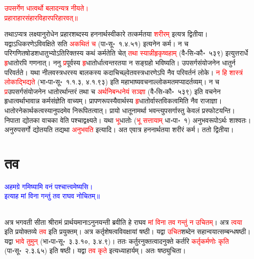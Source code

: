 \centering\textcolor{red}{उपसर्गेण धात्वर्थो बलादन्यत्र नीयते।\nopagebreak\\
प्रहाराहारसंहारविहारपरिहारवत्॥}\\
\begin{sloppypar}\justifying\noindent\hspace{10mm} तथाऽप्यत्र 
लक्ष्यानुरोधेन प्रहार\-शब्दस्य हननार्थ\-स्वीकारे तत्कर्मतया \textcolor{red}{शरीरम्‌} इत्यत्र द्वितीया। यद्वाऽधिकरणेऽविवक्षिते सति \textcolor{red}{अकथितं च} (पा॰सू॰~१.४.५१) इत्यनेन कर्म। न च परिगणित\-षोडश\-धातुभ्योऽतिरिक्तस्य कथं कर्मतेति चेत् \textcolor{red}{तथा स्यान्नीहृकृष्वहाम्‌} (वै॰सि॰कौ॰~५३९) इत्युत्तरार्धे \textcolor{red}{हृ}\-धातोरपि गणनात्। ननु \textcolor{red}{प्र}\-पूर्वस्य \textcolor{red}{हृ}\-धातोर्धात्वन्तरतया न सङ्ग्रहो भविष्यति। उपसर्ग\-संयोजनेन धातुर्न परिवर्तते। यथा नील\-वस्त्र\-धरस्य बालकस्य कदाचिच्छ्वेत\-वस्त्र\-धारणेऽपि नैव परिवर्तनं लोके। \textcolor{red}{न हि शास्त्रं लोकाद्भिद्यते} (भा॰पा॰सू॰~१.१.३, ४.१.९३) इति महा\-भाष्य\-वचनाल्लोक\-मतमप्यादर्तव्यम्। न च \textcolor{red}{प्र}\-उपसर्ग\-संयोजनेन धातोरर्थान्तरं तथा च \textcolor{red}{अर्थ\-निबन्धनेयं सञ्ज्ञा} (वै॰सि॰कौ॰~५३९) इति वचनेन हृधात्वर्थाभावान्न कर्म\-संज्ञेति वाच्यम्। प्रापण\-रूपस्यैवार्थस्य \textcolor{red}{हृ}\-धातोर्वास्तविकत्वमिति नैव राजाज्ञा। धातोरनेकार्थकत्वस्यानुपदमेव निरूपितत्वात्। प्रायो धातूनामर्था भवन्त्युपसर्गास्तु केवलं प्रस्फोटयन्ति। निपाता द्योतका वाचका वेति पश्चाद्वक्ष्यते। यथा \textcolor{red}{भू}\-धातोः (\textcolor{red}{भू सत्तायाम्} धा॰पा॰~१) अनुभव\-रूपोऽर्थः शाश्वतः। अनुरुपसर्गो द्योतयति तद्यथा \textcolor{red}{अनुभवति} इत्यादि।
अत एवात्र हननार्थतया शरीरं कर्म। ततो द्वितीया।\end{sloppypar}
\section[तव]{तव}
\centering\textcolor{blue}{अहमग्रे गमिष्यामि वनं पश्चात्त्वमेष्यसि।\nopagebreak\\
इत्याह मां विना गन्तुं तव राघव नोचितम्॥}\nopagebreak\\
\\
\begin{sloppypar}\justifying\noindent\hspace{10mm} अत्र भगवती सीता श्रीरामं प्रार्थयमानाऽनुनयन्ती ब्रवीति हे राघव \textcolor{red}{मां विना तव गन्तुं न उचितम्‌}। अत्र \textcolor{red}{त्वया} इति प्रयोक्तव्ये \textcolor{red}{तव} इति प्रयुक्तम्। अत्र कर्तृ\-शेषत्व\-विवक्षायां षष्ठी। यद्वा \textcolor{red}{उचित}\-शब्देन सहान्वयात्सम्बन्ध\-षष्ठी। यद्वा \textcolor{red}{भावे तुमुन्‌} (भा॰पा॰सू॰~३.३.१०, ३.४.९)। ततः कर्तुरनुक्तत्वादनुक्ते कर्तरि \textcolor{red}{कर्तृ\-कर्मणोः कृति} (पा॰सू॰~२.३.६५) इति षष्ठी।
यद्वा \textcolor{red}{तव कृते} इत्यध्याहार्यम्। अतः षष्ठ्युचिता।\end{sloppypar}
